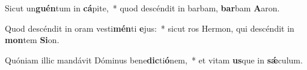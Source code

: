 \item Sicut un\textbf{guén}tum in \textbf{cá}pite,~* quod descéndit in barbam, \textbf{bar}bam \textbf{A}aron.
\item Quod descéndit in oram vesti\textbf{mén}ti \textbf{e}jus:~* sicut ros Hermon, qui descéndit in \textbf{mon}tem \textbf{Si}on.
\item Quóniam illic mandávit Dóminus bene\textbf{dic}ti\textbf{ó}nem,~* et vitam \textbf{us}que in \textbf{sǽ}culum.
